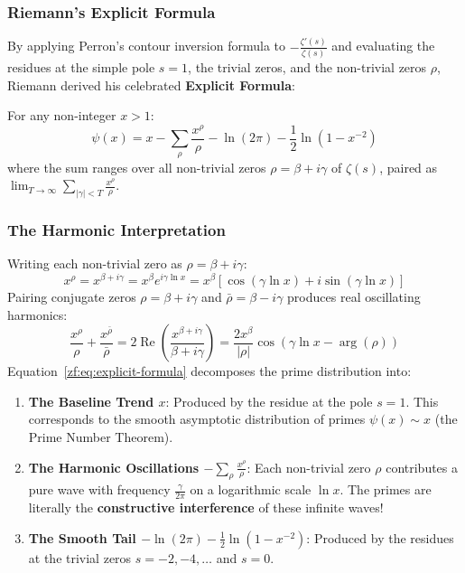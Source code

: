 \documentclass[a4paper]{article}
\begin{document}
\subsubsection{Riemann's Explicit Formula}
By applying Perron's contour inversion formula to $-\frac{\zeta'(s)}{\zeta(s)}$ and evaluating the residues at the simple pole $s=1$, the trivial zeros, and the non-trivial zeros $\rho$, Riemann derived his celebrated \textbf{Explicit Formula}:

\begin{theorem}\label{zf:thm:explicit-formula}
For any non-integer $x > 1$:
\begin{equation}
    \label{zf:eq:explicit-formula}
    \boxed{
        \psi(x) = x - \sum_{\rho} \frac{x^\rho}{\rho} - \ln(2\pi) - \frac{1}{2} \ln(1 - x^{-2})
    }
\end{equation}
where the sum ranges over all non-trivial zeros $\rho = \beta + i\gamma$ of $\zeta(s)$, paired as $\lim_{T \to \infty} \sum_{|\gamma| < T} \frac{x^\rho}{\rho}$.
\end{theorem}

\subsubsection{The Harmonic Interpretation}
Writing each non-trivial zero as $\rho = \beta + i \gamma$:
\begin{equation}
    x^\rho = x^{\beta + i \gamma} = x^\beta e^{i \gamma \ln x} = x^\beta \left[ \cos(\gamma \ln x) + i \sin(\gamma \ln x) \right]
\end{equation}
Pairing conjugate zeros $\rho = \beta + i \gamma$ and $\bar{\rho} = \beta - i \gamma$ produces real oscillating harmonics:
\begin{equation*}
    \frac{x^\rho}{\rho} + \frac{x^{\bar{\rho}}}{\bar{\rho}} = 2 \operatorname{Re}\left( \frac{x^{\beta + i\gamma}}{\beta + i\gamma} \right) = \frac{2 x^\beta}{|\rho|} \cos\left( \gamma \ln x - \arg(\rho) \right)
\end{equation*}
Equation~\eqref{zf:eq:explicit-formula} decomposes the prime distribution into:
\begin{enumerate}[label=\arabic*.]
    \item \textbf{The Baseline Trend $x$}: Produced by the residue at the pole $s = 1$. This corresponds to the smooth asymptotic distribution of primes $\psi(x) \sim x$ (the Prime Number Theorem).
    \item \textbf{The Harmonic Oscillations $-\sum_\rho \frac{x^\rho}{\rho}$}: Each non-trivial zero $\rho$ contributes a pure wave with frequency $\frac{\gamma}{2\pi}$ on a logarithmic scale $\ln x$. The primes are literally the \textbf{constructive interference} of these infinite waves!
    \item \textbf{The Smooth Tail $-\ln(2\pi) - \frac{1}{2}\ln(1-x^{-2})$}: Produced by the residues at the trivial zeros $s = -2, -4, \dots$ and $s = 0$.
\end{enumerate}
\end{document}
